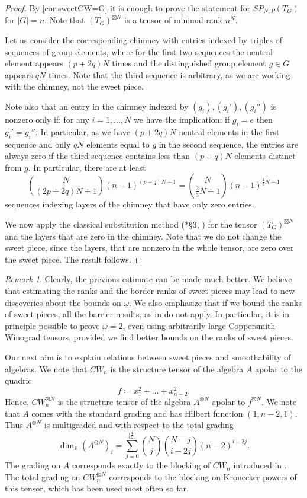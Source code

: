 \documentclass[a4paper,11pt,reqno]{amsart}
\newcommand{\bbK}{\mathbb{K}}
\numberwithin{equation}{section}
\theoremstyle{definition}
\theoremstyle{plain}
\theoremstyle{remark}
\newtheorem{rem}[defn]{Remark}
\begin{document}
\begin{proof}
By \autoref{cor:sweetCW=G} it is enough to prove the statement for $SP_{N,P}(T_G)$ for $|G|=n$. Note that $(T_G)^{\boxtimes N}$ is a tensor of minimal rank $n^N$.

Let us consider the corresponding chimney with entries indexed by triples of sequences of group elements, where for the first two sequences the neutral element appears $(p+2q)N$ times and the distinguished group element $g\in G$ appears $qN$ times. Note that the third sequence is arbitrary, as we are working with the chimney, not the sweet piece.

Note also that an entry in the chimney indexed by $(g_i), (g_i'), (g_i'')$ is nonzero only if:
for any $i=1,\dots, N$ we have the implication:
if $g_i=e$ then $g_i'=g_i''$. In particular, as we have $(p+2q)N$ neutral elements in the first sequence and only $qN$ elements equal to $g$ in the second sequence, the entries are always zero if the third sequence contains less than $(p+q)N$ elements distinct from $g$. In particular, there are at least \[\binom{N}{(2p+2q)N+1}(n-1)^{(p+q)N-1}=\binom{N}{\frac{2}{3}N+1}(n-1)^{\frac{1}{3}N-1}\] sequences indexing layers of the chimney that have only zero entries.

We now apply the classical substitution method (\cite{landsberg2017abelian}*{\S 3},  \cite{pan1966means}) for the tensor $(T_G)^{\boxtimes N}$ and the layers that are zero in the chimney. Note that we do not change the sweet piece, since the layers, that are nonzero in the whole tensor, are zero over the sweet piece. The result follows.
\end{proof}
\begin{rem}
Clearly, the previous estimate can be made much better. We believe that estimating the ranks and the border ranks of sweet pieces may lead to new discoveries about the bounds on $\omega$. We also emphasize that if we bound the ranks of sweet pieces, all the barrier results, as in  \cite{CVZ21}
do not apply. In particular, it is in principle possible to prove $\omega=2$, even using arbitrarily large Coppersmith-Winograd tensors, provided we find better bounds on the ranks of sweet pieces.
\end{rem}

Our next aim is to explain relations between sweet pieces and smoothability of algebras.
We note that $CW_n$ is the structure tensor of the algebra $A$ apolar to the quadric \[f\coloneqq x_1^2+\dots+x_{n-2}^2.\]
Hence, $CW_n^{\boxtimes N}$ is the structure tensor of the algebra $A^{\otimes N}$ apolar to $f^{\boxtimes N}$. We note that $A$ comes with the standard grading and has Hilbert function $(1,n-2,1)$. Thus $A^{\otimes N}$ is multigraded and with respect to the total grading \[\dim_{\bbK} (A^{\otimes N})_i=\sum_{j=0}^{\lfloor \frac{i}{2}\rfloor} \binom{N}{j}\binom{N-j}{i-2j}(n-2)^{i-2j}.\]
The grading on $A$ corresponds exactly to the blocking of $CW_n$ introduced in \cite{CW}. The total grading on $CW_n^{\boxtimes N}$ corresponds to the blocking on Kronecker powers of this tensor, which has been used most often so far.
\end{document}
